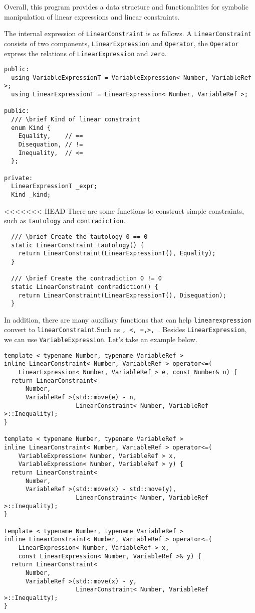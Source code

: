 \documentclass[12pt]{article}
\begin{document}
Overall, this program provides a data structure and functionalities for symbolic manipulation of linear expressions and linear constraints.

The internal expression of \texttt{LinearConstraint} is as follows. A \texttt{LinearConstraint} consists of two components, \texttt{LinearExpression} and \texttt{Operator}, the \texttt{Operator} express the relations of \texttt{LinearExpression} and \texttt{zero}. 
\begin{lstlisting}
public:
  using VariableExpressionT = VariableExpression< Number, VariableRef >;
  using LinearExpressionT = LinearExpression< Number, VariableRef >;

public:
  /// \brief Kind of linear constraint
  enum Kind {
    Equality,    // ==
    Disequation, // !=
    Inequality,  // <=
  };

private:
  LinearExpressionT _expr;
  Kind _kind;
\end{lstlisting}

<<<<<<< HEAD
There are some functions to construct simple constraints, such as \texttt{tautology} and \texttt{contradiction}.
\begin{lstlisting}
  /// \brief Create the tautology 0 == 0
  static LinearConstraint tautology() {
    return LinearConstraint(LinearExpressionT(), Equality);
  }

  /// \brief Create the contradiction 0 != 0
  static LinearConstraint contradiction() {
    return LinearConstraint(LinearExpressionT(), Disequation);
  }
\end{lstlisting}

In addition, there are many auxiliary functions that can help \texttt {linearexpression} convert to \texttt {linearConstraint}.Such as \texttt {\leq, <, =,>, \geq}. Besides \texttt{LinearExpression}, we can use \texttt{VariableExpression}. Let's take an example below.

\begin{lstlisting}
template < typename Number, typename VariableRef >
inline LinearConstraint< Number, VariableRef > operator<=(
    LinearExpression< Number, VariableRef > e, const Number& n) {
  return LinearConstraint<
      Number,
      VariableRef >(std::move(e) - n,
                    LinearConstraint< Number, VariableRef >::Inequality);
}

template < typename Number, typename VariableRef >
inline LinearConstraint< Number, VariableRef > operator<=(
    VariableExpression< Number, VariableRef > x,
    VariableExpression< Number, VariableRef > y) {
  return LinearConstraint<
      Number,
      VariableRef >(std::move(x) - std::move(y),
                    LinearConstraint< Number, VariableRef >::Inequality);
}

template < typename Number, typename VariableRef >
inline LinearConstraint< Number, VariableRef > operator<=(
    LinearExpression< Number, VariableRef > x,
    const LinearExpression< Number, VariableRef >& y) {
  return LinearConstraint<
      Number,
      VariableRef >(std::move(x) - y,
                    LinearConstraint< Number, VariableRef >::Inequality);
}
\end{lstlisting}
\end{document}
